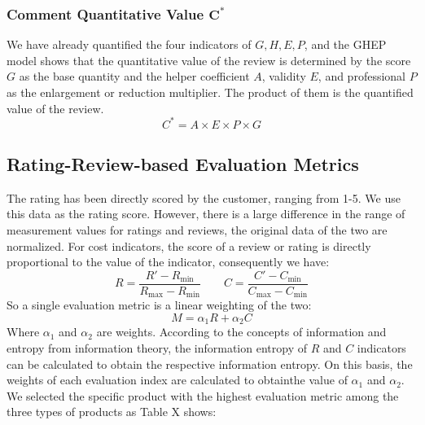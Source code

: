 \documentclass{mcmthesis}
\begin{document}
\subsubsection{Comment Quantitative Value $\mathbf{C}^{*}$}
We have already quantified the four indicators of $G, H, E, P$, and the GHEP model shows that the quantitative value of the review is determined by the score $ G $ as the base quantity and the helper coefficient $ A $, validity $ E $, and professional $ P $ as the enlargement or reduction multiplier. The product of them is the quantified value of the review.
\begin{equation}
C^*=A\times E\times P\times G
\end{equation}

\subsection{Rating-Review-based Evaluation Metrics}
The rating has been directly scored by the customer, ranging from 1-5. We use this data as the rating score. However, there is a large difference in the range of measurement values for ratings and reviews, the original data of the two are normalized. For cost indicators, the score of a review or rating is directly proportional to the value of the indicator, consequently we have:
\begin{equation}
R=\frac{R'-R_{\min}}{R_{\max}-R_{\min}}\quad \quad C=\frac{C'-C_{\min}}{C_{\max}-C_{\min}}
\end{equation}
So a single evaluation metric is a linear weighting of the two:
\begin{equation}
M=\alpha _1R+\alpha _2C
\end{equation}
Where $\alpha_1$ and $\alpha_2$ are weights. According to the concepts of information and entropy from information theory, the information entropy of $ R $ and $ C $ indicators can be calculated to obtain the respective information entropy. On this basis, the weights of each evaluation index are calculated to obtainthe value of $\alpha_1$ and $\alpha_2$. We selected the specific product with the highest evaluation metric among the three types of products as Table X shows:
\end{document}
